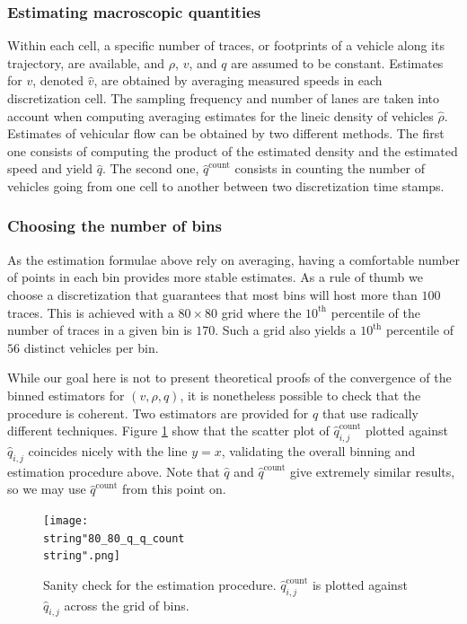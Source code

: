 \documentclass[a4paper, 10pt, conference]{ieeeconf}      %
\DeclareMathOperator{\cnt}{count}
\begin{document}
\subsubsection{Estimating macroscopic quantities}
Within each cell, a specific number of traces, or footprints of a vehicle along its trajectory, are available, and $\rho$, $v$, and $q$ are assumed to be constant. Estimates for $v$, denoted $\hat{v}$, are obtained by averaging measured speeds in each discretization cell. The sampling frequency and number of lanes are taken into account when computing averaging estimates for the lineic density of vehicles $\hat{\rho}$. Estimates of vehicular flow can be obtained by two different methods. The first one consists of computing the product of the estimated density and the estimated speed and yield $\hat{q}$. The second one, $\hat{q}^{\text{count}}$ consists in counting the number of vehicles going from one cell to another between two discretization time stamps.

\subsubsection{Choosing the number of bins}

As the estimation formulae above rely on averaging, having a comfortable
number of points in each bin provides more stable estimates. As a rule of thumb we choose a discretization that guarantees that most bins will host more than $100$ traces. This is achieved with a $80\times80$ grid where the $10^{\text{th}}$ percentile of the number of traces in a given bin is $170$. Such a grid also yields a $10^{\text{th}}$ percentile of $56$ distinct vehicles per bin.

While our goal here is not to present theoretical proofs of the convergence of the binned estimators for $\left(v,\rho,q\right)$, it is nonetheless possible to check that the procedure is coherent. Two estimators are provided for $q$ that use radically different techniques. Figure \ref{fig:Sanity-check} show that the scatter plot of $\widehat{q}_{i,j}^{\cnt}$ plotted against $\widehat{q}_{i,j}$ coincides nicely with the line $y=x$, validating the overall binning and estimation procedure above. Note that $\widehat{q}$ and $\widehat{q}^{\text{count}}$ give extremely similar results, so we may use $\widehat{q}^{\text{count}}$ from this point on.

\begin{figure}
\centering
\texttt{[image: \\string"80\_80\_q\_q\_count\\string".png]}
\protect\caption{Sanity check for the estimation procedure. $\widehat{q}_{i,j}^{\text{count}}$
is plotted against $\widehat{q}_{i,j}$ across the grid of bins.
\label{fig:Sanity-check}}
\end{figure}
\end{document}
